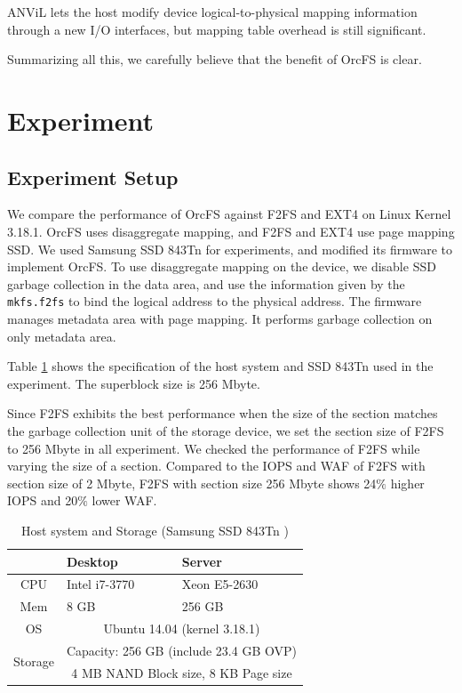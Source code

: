 \documentclass[prodmode,acmtecs]{acmsmall}
\begin{document}
ANViL \cite{anvil} lets the host modify device logical-to-physical
mapping information through a new I/O interfaces, but mapping table
overhead is still significant.

Summarizing all this, we carefully believe that the benefit of OrcFS
is clear.


\section{Experiment}
\label{sec:experiment}

\subsection{Experiment Setup}
\label{subsec:exp_setup}

We compare the performance of OrcFS against F2FS and EXT4 on Linux
Kernel 3.18.1. OrcFS uses disaggregate mapping, and F2FS and EXT4 use
page mapping SSD.  We used Samsung SSD 843Tn \cite{ssd843tn} for
experiments, and modified its firmware to implement OrcFS.  To use
disaggregate mapping on the device, we disable SSD garbage collection
in the data area, and use the information given by the
\texttt{mkfs.f2fs} to bind the logical address to the physical
address. The firmware manages metadata area with page mapping. It
performs garbage collection on only metadata area.


Table \ref{tab:ssd_info} shows the specification of the host system
and SSD 843Tn used in the experiment. The superblock size is 256
Mbyte.

Since F2FS exhibits the best performance when the size of the section
matches the garbage collection unit of the storage device, we set the
section size of F2FS to 256 Mbyte in all experiment.  We checked the
performance of F2FS while varying the size of a section.  Compared to
the IOPS and WAF of F2FS with section size of 2 Mbyte, F2FS with
section size 256 Mbyte shows 24$\%$ higher IOPS and 20$\%$ lower WAF.


\begin{table}[t]
\begin{center}
\begin{tabular}{|c|p{3cm}|p{3cm}|} 			\hline
			& Desktop			& Server		\\ \hline\hline
		CPU	& Intel i7-3770	& Xeon E5-2630 \\ \hline
		Mem	& 8 GB			& 256 GB 		\\ \hline
		OS	&	\multicolumn{2}{c|}{Ubuntu 14.04 (kernel 3.18.1)} \\ \hline
\multirow{2}{*}{Storage}	& \multicolumn{2}{c|}{Capacity: 256 GB (include 23.4 GB OVP)}  \\ 
						& \multicolumn{2}{c|}{4 MB NAND Block size, 8 KB Page size}  \\ \hline
\end{tabular}
\end{center}
\caption{Host system and Storage (Samsung SSD 843Tn \protect\cite{ssd843tn})}
\label{tab:ssd_info}
\end{table}
\end{document}
